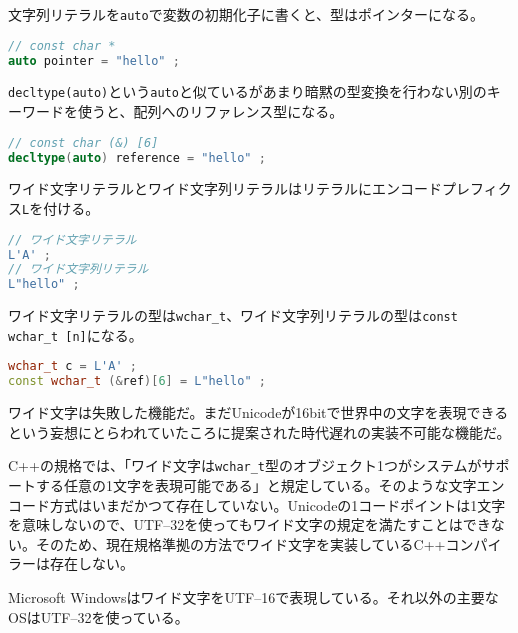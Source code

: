 文字列リテラルを\texttt{auto}で変数の初期化子に書くと、型はポインターになる。

\ifTombow\pagebreak\fi
\begin{lstlisting}[language={C++}]
// const char *
auto pointer = "hello" ;
\end{lstlisting}

\texttt{decltype(auto)}という\texttt{auto}と似ているがあまり暗黙の型変換を行わない別のキーワードを使うと、配列へのリファレンス型になる。

\begin{lstlisting}[language={C++}]
// const char (&) [6]
decltype(auto) reference = "hello" ;
\end{lstlisting}


ワイド文字リテラルとワイド文字列リテラルはリテラルにエンコードプレフィクス\texttt{L}を付ける。

\begin{lstlisting}[language={C++}]
// ワイド文字リテラル
L'A' ;
// ワイド文字列リテラル
L"hello" ;
\end{lstlisting}

ワイド文字リテラルの型は\texttt{wchar\_t}、ワイド文字列リテラルの型は\texttt{const wchar\_t [n]}になる。

\begin{lstlisting}[language={C++}]
wchar_t c = L'A' ;
const wchar_t (&ref)[6] = L"hello" ;
\end{lstlisting}

ワイド文字は失敗した機能だ。まだUnicodeが16bitで世界中の文字を表現できるという妄想にとらわれていたころに提案された時代遅れの実装不可能な機能だ。

C++の規格では、「ワイド文字は\texttt{wchar\_t}型のオブジェクト1つがシステムがサポートする任意の1文字を表現可能である」と規定している。そのような文字エンコード方式はいまだかつて存在していない。Unicodeの1コードポイントは1文字を意味しないので、UTF--32を使ってもワイド文字の規定を満たすことはできない。そのため、現在規格準拠の方法でワイド文字を実装しているC++コンパイラーは存在しない。

Microsoft Windowsはワイド文字をUTF--16で表現している。それ以外の主要なOSはUTF--32を使っている。

\clearpage
{}

